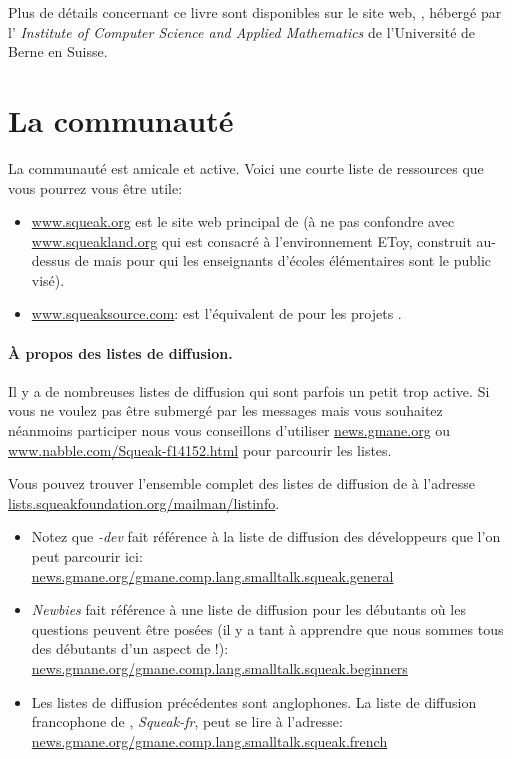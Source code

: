 \documentclass[a4paper,10pt,twoside]{book}
\begin{document}
Plus de d\'etails concernant ce livre sont disponibles sur le site
web, \spe, h\'eberg\'e par l' \emph{Institute of Computer Science and
  Applied Mathematics} de l'Universit\'e de Berne en Suisse.

\section*{La communaut\'e \sq}

La communaut\'e \sq est amicale et active.
Voici une courte liste de ressources que vous pourrez vous \^etre utile:

\begin{itemize}
\item \url{www.squeak.org} est le site web principal de \sq (\`a ne
  pas confondre avec  \url{www.squeakland.org} qui est consacr\'e \`a
  l'environnement EToy, construit au-dessus de \sq mais pour qui
  les enseignants d'\'ecoles \'el\'ementaires sont le public vis\'e).

\item \url{www.squeaksource.com}: \squeaksource est l'\'equivalent de \sourceforge pour les projets \sq.
\end{itemize}

\paragraph{\`A propos des listes de diffusion.} Il y a de nombreuses listes de diffusion qui sont parfois un petit trop active. Si vous ne voulez pas \^etre submerg\'e par les messages mais vous souhaitez n\'eanmoins participer nous vous conseillons d'utiliser \url{news.gmane.org} ou \url{www.nabble.com/Squeak-f14152.html} pour parcourir les listes.

Vous pouvez trouver l'ensemble complet des listes de diffusion de \sq \`a l'adresse \url{lists.squeakfoundation.org/mailman/listinfo}.

\begin{itemize}
\item Notez que \emph{\sq-dev} fait r\'ef\'erence \`a la liste de diffusion des d\'eveloppeurs  que l'on peut parcourir ici:\\
\url{news.gmane.org/gmane.comp.lang.smalltalk.squeak.general}
\item \emph{Newbies} fait r\'ef\'erence \`a une liste de diffusion
  pour les d\'ebutants o\`u les questions peuvent \^etre pos\'ees (il
  y a tant \`a apprendre que nous sommes tous des d\'ebutants d'un
  aspect de \sq!):\\
\url{news.gmane.org/gmane.comp.lang.smalltalk.squeak.beginners}
\item Les listes de diffusion pr\'ec\'edentes sont anglophones. La
  liste de diffusion francophone de \sq, \emph{Squeak-fr}, peut se
  lire \`a l'adresse:\\
\url{news.gmane.org/gmane.comp.lang.smalltalk.squeak.french}
\end{itemize}
\end{document}
